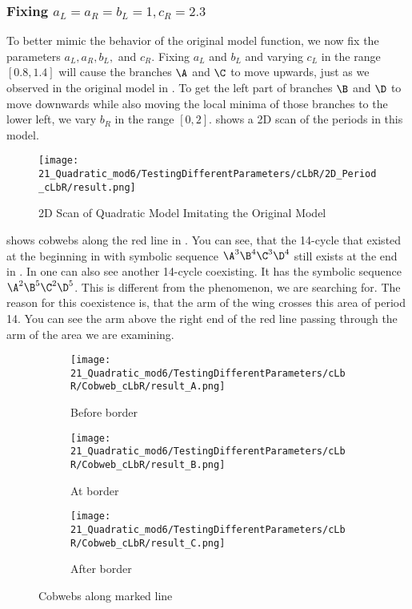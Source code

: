 \subsubsection{Fixing $a_L = a_R = b_L = 1, c_R = 2.3$}

To better mimic the behavior of the original model function, we now fix the parameters $a_L, a_R, b_L,$ and $c_R$.
Fixing $a_L$ and $b_L$ and varying $c_L$ in the range $[0.8, 1.4]$ will cause the branches $\A$ and $\C$ to move upwards, just as we observed in the original model in .
To get the left part of branches $\B$ and $\D$ to move downwards while also moving the local minima of those branches to the lower left, we vary $b_R$ in the range $[0, 2]$.
 shows a 2D scan of the periods in this model.


\begin{figure}
    \centering
    \texttt{[image: 21\_Quadratic\_mod6/TestingDifferentParameters/cLbR/2D\_Period\_cLbR/result.png]}
    \caption{2D Scan of Quadratic Model Imitating the Original Model}
    \label{fig:quadratic.full.cLbR.2d.full}
\end{figure}

 shows cobwebs along the red line in .
You can see, that the 14-cycle that existed at the beginning in  with symbolic sequence $\A^3\B^4\C^3\D^4$ still exists at the end in .
In  one can also see another 14-cycle coexisting.
It has the symbolic sequence $\A^2\B^5\C^2\D^5$.
This is different from the phenomenon, we are searching for.
The reason for this coexistence is, that the arm of the wing crosses this area of period 14.
You can see the arm above the right end of the red line passing through the arm of the area we are examining.

\begin{figure}
    \centering
    \begin{subfigure}{0.3\textwidth}
        \centering
        \texttt{[image: 21\_Quadratic\_mod6/TestingDifferentParameters/cLbR/Cobweb\_cLbR/result\_A.png]}
        \caption{Before border}
        \label{fig:quad.full.cLbR.CobwebA}
    \end{subfigure}
    \begin{subfigure}{0.3\textwidth}
        \centering
        \texttt{[image: 21\_Quadratic\_mod6/TestingDifferentParameters/cLbR/Cobweb\_cLbR/result\_B.png]}
        \caption{At border}
        \label{fig:quad.full.cLbR.CobwebB}
    \end{subfigure}
    \begin{subfigure}{0.3\textwidth}
        \centering
        \texttt{[image: 21\_Quadratic\_mod6/TestingDifferentParameters/cLbR/Cobweb\_cLbR/result\_C.png]}
        \caption{After border}
        \label{fig:quad.full.cLbR.CobwebC}
    \end{subfigure}
    \caption{Cobwebs along marked line}
    \label{fig:quad.full.cLbR.Cobwebs}
\end{figure}


